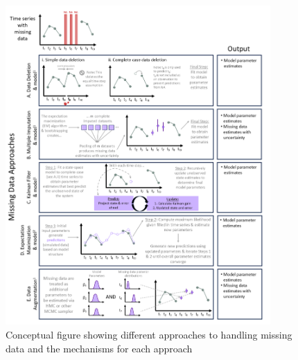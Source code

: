 \documentclass{article}
\begin{document}
\begin{figure}[h]
     \noindent\includegraphics[width = 0.9\textwidth]{Figures/ConceptualFigure.png}
     \caption{Conceptual figure showing different approaches to handling missing data and the mechanisms for each approach}
     \label{fig:ConceptualFigure}
 \end{figure}
\end{document}
